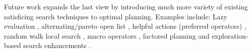 Future work expands the last view by introducing much more variety of
existing satisficing search techniques to optimal planning. Examples
include: Lazy evaluation \cite{richter2010lama}, alternating/pareto open
list \cite{RogerH10}, helpful actions (preferred operators) \cite{Hoffmann01},
random walk local search \cite{nakhost2009monte}, macro operators
\cite{Botea2005,ChrpaVM15}, factored planning
\cite{amir2003factored,brafman2006factored,Asai2015} and
exploration-based search enhancements
\cite{valenzano2014comparison,xie14type,Valenzano2016}.
